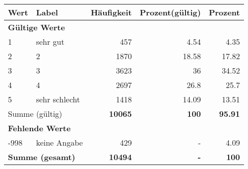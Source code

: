      \begin{longtable}{lXrrr}
     \toprule
     \textbf{Wert} & \textbf{Label} & \textbf{Häufigkeit} & \textbf{Prozent(gültig)} & \textbf{Prozent} \\
     \endhead
     \midrule
     \multicolumn{5}{l}{\textbf{Gültige Werte}}\\

     1 &
     \multicolumn{1}{X}{ sehr gut   } &


       \num{457} &
       \num[round-mode=places,round-precision=2]{4,54} &
         \num[round-mode=places,round-precision=2]{4,35} \\

     2 &
     \multicolumn{1}{X}{ 2   } &


       \num{1870} &
       \num[round-mode=places,round-precision=2]{18,58} &
         \num[round-mode=places,round-precision=2]{17,82} \\

     3 &
     \multicolumn{1}{X}{ 3   } &


       \num{3623} &
       \num[round-mode=places,round-precision=2]{36} &
         \num[round-mode=places,round-precision=2]{34,52} \\

     4 &
     \multicolumn{1}{X}{ 4   } &


       \num{2697} &
       \num[round-mode=places,round-precision=2]{26,8} &
         \num[round-mode=places,round-precision=2]{25,7} \\

     5 &
     \multicolumn{1}{X}{ sehr schlecht   } &


       \num{1418} &
       \num[round-mode=places,round-precision=2]{14,09} &
         \num[round-mode=places,round-precision=2]{13,51} \\
     \midrule
     \multicolumn{2}{l}{Summe (gültig)} &
       \textbf{\num{10065}} &
     \textbf{100} &
       \textbf{\num[round-mode=places,round-precision=2]{95,91}} \\
     \multicolumn{5}{l}{\textbf{Fehlende Werte}}\\
       -998 &
       keine Angabe &
         \num{429} &
        - &
         \num[round-mode=places,round-precision=2]{4,09} \\
     \midrule
     \multicolumn{2}{l}{\textbf{Summe (gesamt)}} &
          \textbf{\num{10494}} &
        \textbf{-} &
        \textbf{100} \\
     \bottomrule
     \end{longtable}
     
